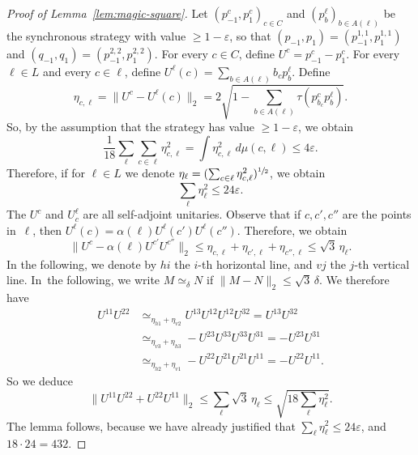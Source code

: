 \documentclass[10pt]{amsart}
\let\ts\textstyle
\theoremstyle{plain}
\theoremstyle{definition}
\begin{document}
\begin{proof}[Proof of Lemma~\ref{lem:magic-square}]
Let $(p^c_{-1},p^c_1)_{c \in C}$ and $(p^\ell_b)_{b \in A(\ell)}$ be the synchronous strategy with value $\geq 1-\varepsilon$, so that $(p_{-1},p_1) =(p^{1,1}_{-1},p^{1,1}_1)$ and $(q_{-1},q_1) =(p^{2,2}_{-1},p^{2,2}_1)$. For every $c \in C$, define $U^{c} = p^{c}_{-1}-p^c_1$. For every $\ell \in L$ and every $c\in \ell$, define $U^\ell(c) = \sum_{b \in A(\ell)} b_c p^\ell_b$. Define
\[\ts
\eta_{c,\ell} = \|U^c - U^\ell(c)\|_2 = 2\sqrt{ 1-\sum_{b \in A(\ell)} \tau(p^c_{b_c} p^\ell_b)}.
\]
So, by the assumption that the strategy has value $\geq 1-\varepsilon$, we obtain
\[
\frac{1}{18} \sum_{\ell} \sum_{c \in \ell} \eta_{c,\ell}^2 =\int \eta_{c,\ell}^2 \,d\mu(c,\ell) \leq 4\varepsilon.
\]
Therefore, if for $\ell \in L$ we denote $\eta_\ell = (\sum_{c \in \ell} \eta_{c,\ell}^2)^{\sfrac 1 2}$, we obtain
\[
\sum_\ell \eta_\ell^2 \leq 24 \varepsilon.
\]
The $U^c$ and $U^\ell_c$ are all self-adjoint unitaries. Observe that if $c,c',c''$ are the points in~$\ell$, then $U^\ell(c) = \alpha(\ell) U^{\ell}(c') U^{\ell}(c'')$. Therefore, we obtain
\[
\|U^c - \alpha(\ell) U^{c'} U^{c''}\|_2 \leq \eta_{c,\ell} + \eta_{c',\ell} +\eta_{c'',\ell} \leq \sqrt{3}\,\eta_\ell.
\]
In the following, we denote by $hi$ the $i$-th horizontal line, and $vj$ the $j$-th vertical line. In~the following, we write $M\simeq_\delta N$ if $\|M-N\|_2 \leq \sqrt{3}\,\delta$. We therefore have
\begin{align*} U^{11}U^{22} &\simeq_{\eta_{h1}+\eta_{v2}} U^{13}U^{12} U^{12}U^{32} = U^{13}U^{32}\\
& \simeq_{\eta_{v3}+\eta_{h3}} -U^{23}U^{33}U^{33}U^{31} = -U^{23}U^{31}\\
& \simeq_{\eta_{h2}+\eta_{v1}} - U^{22}U^{21} U^{21}U^{11} = - U^{22}U^{11}.
\end{align*}
So we deduce
\[\ts
\|U^{11}U^{22} + U^{22}U^{11}\|_2 \leq \sum_\ell \sqrt{3}\, \eta_\ell \leq \sqrt{18 \sum_{\ell} \eta_\ell^2} .
\]
The lemma follows, because we have already justified that $\sum_\ell \eta_\ell^2 \leq 24 \varepsilon$, and $18 \cdot 24 = 432$.
\end{proof}
\end{document}
